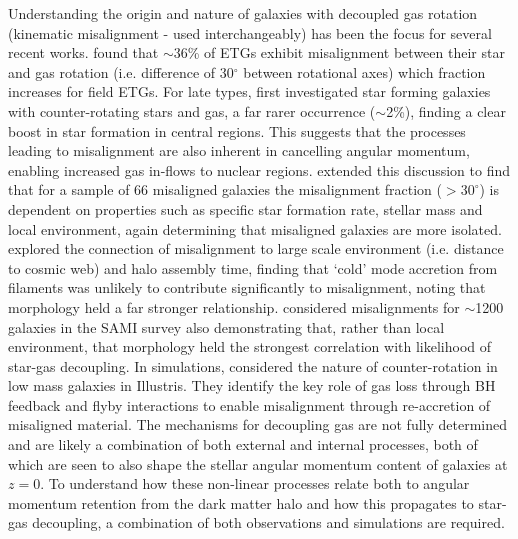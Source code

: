 \documentclass[fleqn,usenatbib]{mnras}
\begin{document}
Understanding the origin and nature of galaxies with decoupled gas rotation (kinematic misalignment - used interchangeably) has been the focus for several recent works. \citet{davis2011} found that $\sim 36$\% of ETGs exhibit misalignment between their star and gas rotation (i.e. difference of 30$^{\circ}$ between rotational axes) which fraction increases for field ETGs. For late types, \citet{chen2016} first investigated star forming galaxies with counter-rotating stars and gas, a far rarer occurrence ($\sim$2\%), finding a clear boost in star formation in central regions. This suggests that the processes leading to misalignment are also inherent in cancelling angular momentum, enabling increased gas in-flows to nuclear regions. \citet{jin2016} extended this discussion to find that for a sample of 66 misaligned galaxies the misalignment fraction ($> 30^{\circ}$) is dependent on properties such as specific star formation rate, stellar mass and local environment, again determining that misaligned galaxies are more isolated. \citet{duckworth2019} explored the connection of misalignment to large scale environment (i.e. distance to cosmic web) and halo assembly time, finding that `cold' mode accretion from filaments was unlikely to contribute significantly to misalignment, noting that morphology held a far stronger relationship. \citep{bryant2019} considered misalignments for $\sim$1200 galaxies in the SAMI survey also demonstrating that, rather than local environment, that morphology held the strongest correlation with likelihood of star-gas decoupling. In simulations, \citet{starkenburg+19} considered the nature of counter-rotation in low mass galaxies in Illustris. They identify the key role of gas loss through BH feedback and flyby interactions to enable misalignment through re-accretion of misaligned material. The mechanisms for decoupling gas are not fully determined and are likely a combination of both external and internal processes, both of which are seen to also shape the stellar angular momentum content of galaxies at $z=0$. To understand how these non-linear processes relate both to angular momentum retention from the dark matter halo and how this propagates to star-gas decoupling, a combination of both observations and simulations are required. 
\end{document}
